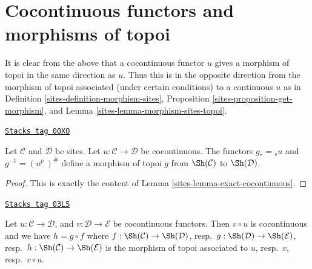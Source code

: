 \section{Cocontinuous functors and morphisms of topoi}
\label{sites-section-cocontinuous-morphism-topoi}
It is clear from the above that a cocontinuous functor $u$
gives a morphism of topoi in the same direction as $u$.
Thus this is in the opposite direction from the morphism of topoi
associated (under certain conditions) to a continuous $u$ as in
Definition \ref{sites-definition-morphism-sites},
Proposition \ref{sites-proposition-get-morphism}, and
Lemma \ref{sites-lemma-morphism-sites-topoi}.

\begin{lemma}
\label{sites-lemma-cocontinuous-morphism-topoi}
\href{https://stacks.math.columbia.edu/tag/00XO}{\texttt{Stacks tag 00XO}}

Let $\mathcal{C}$ and $\mathcal{D}$ be sites.
Let $u : \mathcal{C} \to \mathcal{D}$ be cocontinuous.
The functors $g_* = {}_su$ and $g^{-1} = (u^p\ )^\#$
define a morphism of topoi
$g$ from  $\Sh(\mathcal{C})$ to $\Sh(\mathcal{D})$.
\end{lemma}

\begin{proof}

This is exactly the content of Lemma \ref{sites-lemma-exact-cocontinuous}.
\end{proof}

\begin{lemma}
\label{sites-lemma-composition-cocontinuous}
\href{https://stacks.math.columbia.edu/tag/03L5}{\texttt{Stacks tag 03L5}}


Let $u : \mathcal{C} \to \mathcal{D}$, and $v : \mathcal{D} \to \mathcal{E}$
be cocontinuous functors. Then $v \circ u$ is cocontinuous and we
have $h = g \circ f$
where $f : \Sh(\mathcal{C}) \to \Sh(\mathcal{D})$,
resp.\ $g : \Sh(\mathcal{D}) \to \Sh(\mathcal{E})$,
resp.\ $h : \Sh(\mathcal{C}) \to \Sh(\mathcal{E})$ is the
morphism of topoi associated to $u$, resp.\ $v$, resp.\ $v \circ u$.
\end{lemma}

